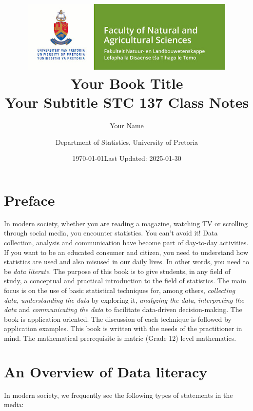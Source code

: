 \documentclass[
]{book}
\title{
  \vspace{2cm}
  \includegraphics[width=0.8\textwidth]{images/UP-NAS-logo.jpg} \\
  \vspace{1cm}
  \textbf{Your Book Title} \\
  \vspace{0.5cm}
  \large{Your Subtitle}
}
\author{Your Name}
\date{\today}
\title{STC 137 Class Notes}
\author{Department of Statistics, University of Pretoria}
\date{Last Updated: 2025-01-30}
\begin{document}
\maketitle

{
\setcounter{tocdepth}{2}
\tableofcontents
}
\chapter*{Preface}\label{preface}

In modern society, whether you are reading a magazine, watching TV or scrolling through social media, you encounter statistics. You can't avoid it! Data collection, analysis and communication have become part of day-to-day activities. If you want to be an educated consumer and citizen, you need to understand how statistics are used and also misused in our daily lives. In other words, you need to be \emph{data literate}. The purpose of this book is to give students, in any field of study, a conceptual and practical introduction to the field of statistics. The main focus is on the use of basic statistical techniques for, among others, \emph{collecting data}, \emph{understanding the data} by exploring it, \emph{analyzing the data}, \emph{interpreting the data} and \emph{communicating the data} to facilitate data-driven decision-making. The book is application oriented. The discussion of each technique is followed by application examples. This book is written with the needs of the practitioner in mind. The mathematical prerequisite is matric (Grade 12) level mathematics.

\chapter{An Overview of Data literacy}\label{an-overview-of-data-literacy}

In modern society, we frequently see the following types of statements in the media:
\end{document}

